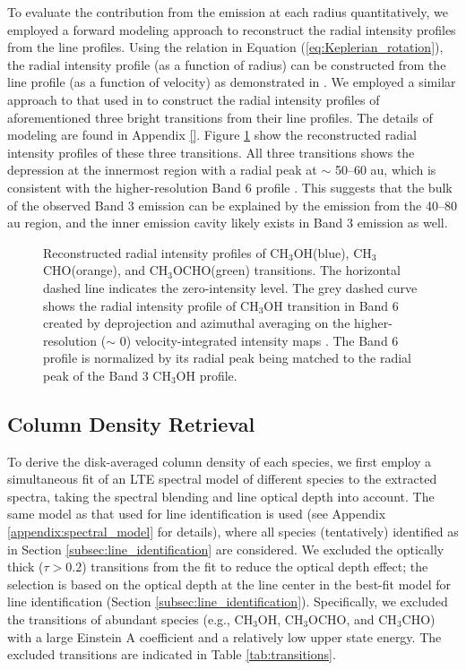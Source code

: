 \documentclass[linenumbers, twocolumn, twocolappendix, astrosymb, times]{aastex631}
\newcommand{\methanol}{CH$_3$OH\xspace}
\newcommand{\acetaldehyde}{CH$_3$CHO\xspace}
\newcommand{\methylformate}{CH$_3$OCHO\xspace}
\begin{document}
To evaluate the contribution from the emission at each radius quantitatively, we employed a forward modeling approach to reconstruct the radial intensity profiles from the line profiles. Using the relation in Equation (\ref{eq:Keplerian_rotation}), the radial intensity profile (as a function of radius) can be constructed from the line profile (as a function of velocity) as demonstrated in \citet{Bosman2021}. We employed a similar approach to that used in \citet{Bosman2021} to construct the radial intensity profiles of aforementioned three bright transitions from their line profiles. The details of modeling are found in Appendix \ref{}. Figure \ref{fig:radial_profile_from_line_profile} show the reconstructed radial intensity profiles of these three transitions. All three transitions shows the depression at the innermost region with a radial peak at $\sim$ 50--60 au, which is consistent with the higher-resolution Band 6 profile \citep{Tobin2023}. This suggests that the bulk of the observed Band 3 emission can be explained by the emission from the 40--80 au region, and the inner emission cavity likely exists in Band 3 emission as well. 

\begin{figure}
\caption{Reconstructed radial intensity profiles of \methanol (blue), \acetaldehyde (orange), and \methylformate (green) transitions. The horizontal dashed line indicates the zero-intensity level. The grey dashed curve shows the radial intensity profile of \methanol transition in Band 6 created by deprojection and azimuthal averaging on the higher-resolution ($\sim$ 0) velocity-integrated intensity maps \citep{Tobin2023}. The Band 6 profile is normalized by its radial peak being matched to the radial peak of the Band 3 \methanol profile.}
\label{fig:radial_profile_from_line_profile}
\end{figure}


\subsection{Column Density Retrieval}\label{subsubsec:spectral_fit}
To derive the disk-averaged column density of each species, we first employ a simultaneous fit of an LTE spectral model of different species to the extracted spectra, taking the spectral blending and line optical depth into account. The same model as that used for line identification is used (see Appendix \ref{appendix:spectral_model} for details), where all species (tentatively) identified as in Section \ref{subsec:line_identification} are considered. We excluded the optically thick ($\tau > 0.2$) transitions from the fit to reduce the optical depth effect; the selection is based on the optical depth at the line center in the best-fit model for line identification (Section \ref{subsec:line_identification}). Specifically, we excluded the transitions of abundant species (e.g., \methanol, \methylformate, and \acetaldehyde) with a large Einstein A coefficient and a relatively low upper state energy. The excluded transitions are indicated in Table \ref{tab:transitions}.
\end{document}
